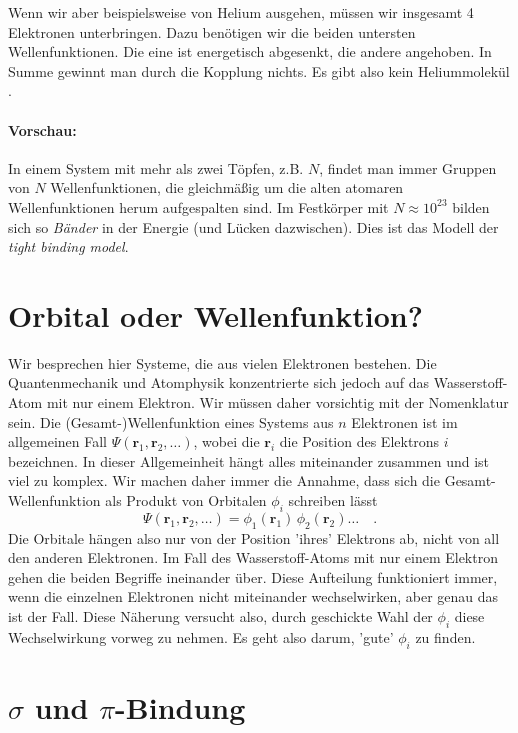 Wenn wir aber beispielsweise von Helium ausgehen, müssen wir insgesamt 4 Elektronen unterbringen. Dazu benötigen wir die beiden untersten Wellenfunktionen. Die eine ist energetisch abgesenkt, die andere angehoben. In Summe gewinnt man durch die Kopplung nichts. Es gibt also kein Heliummolekül  .


\paragraph{Vorschau:} In einem System mit mehr als zwei Töpfen, z.B. $N$, findet man immer Gruppen von $N$ Wellenfunktionen, die gleichmäßig um die alten atomaren Wellenfunktionen herum aufgespalten sind. Im Festkörper mit $N \approx 10^{23}$ bilden sich so \emph{Bänder} in der Energie (und Lücken dazwischen). Dies ist das Modell der \emph{tight binding model}. 


\section{Orbital oder Wellenfunktion?}

Wir besprechen hier Systeme, die  aus vielen Elektronen bestehen. Die Quantenmechanik und Atomphysik konzentrierte sich jedoch auf das Wasserstoff-Atom mit nur einem Elektron. Wir müssen daher vorsichtig mit der Nomenklatur sein. Die (Gesamt-)Wellenfunktion eines Systems aus $n$ Elektronen ist im allgemeinen Fall $\Psi(\mathbf{r}_1, \mathbf{r}_2, \dots)$, wobei die $\mathbf{r}_i$ die Position des Elektrons $i$ bezeichnen. In dieser Allgemeinheit hängt alles miteinander zusammen und ist viel zu komplex. Wir machen daher immer die Annahme, dass sich die Gesamt-Wellenfunktion als Produkt von Orbitalen $\phi_i$ schreiben lässt
\begin{equation}
\Psi(\mathbf{r}_1, \mathbf{r}_2, \dots) = \phi_1(\mathbf{r}_1) \, \phi_2(\mathbf{r}_2)  \dots \quad .
\end{equation}
Die Orbitale hängen also nur von der Position 'ihres' Elektrons ab, nicht von all den anderen Elektronen. Im Fall des Wasserstoff-Atoms mit nur einem Elektron gehen die beiden Begriffe ineinander über.
Diese Aufteilung funktioniert immer, wenn die einzelnen Elektronen nicht miteinander wechselwirken, aber genau das ist der Fall. Diese Näherung versucht also, durch geschickte Wahl der $\phi_i$ diese Wechselwirkung vorweg zu nehmen. Es geht also darum, 'gute' $\phi_i$ zu finden.



\section{$\sigma$ und $\pi$-Bindung}



